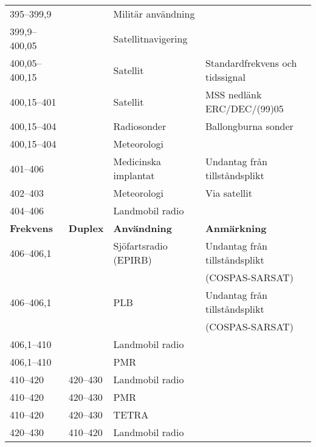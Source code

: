\begin{landscape}
\begin{longtable}{llll}
	395--399,9         &                    & Militär användning      &  \\
	399,9--400,05      &                    & Satellitnavigering      &  \\
	400,05--400,15     &                    & Satellit                & Standardfrekvens och tidssignal          \\
	400,15--401        &                    & Satellit                & MSS nedlänk ERC/DEC/(99)05               \\
	400,15--404        &                    & Radiosonder             & Ballongburna sonder                      \\
	400,15--404        &                    & Meteorologi             &  \\
	401--406           &                    & Medicinska implantat    & Undantag från tillståndsplikt            \\
	402--403           &                    & Meteorologi             & Via satellit                             \\
	404--406           &                    & Landmobil radio         &  \\
	\textbf{Frekvens}  & \textbf{Duplex}    & \textbf{Användning}     & \textbf{Anmärkning}                      \\ \hline
	406--406,1         &                    & Sjöfartsradio (EPIRB)   & Undantag från tillståndsplikt            \\
	                   &                    &                         & (COSPAS-SARSAT)                          \\
	406--406,1         &                    & PLB                     & Undantag från tillståndsplikt            \\
	                   &                    &                         & (COSPAS-SARSAT)                          \\
	406,1--410         &                    & Landmobil radio         &  \\
	406,1--410         &                    & PMR                     &  \\
	410--420           & 420--430           & Landmobil radio         &  \\
	410--420           & 420--430           & PMR                     &  \\
	410--420           & 420--430           & TETRA                   &  \\
	420--430           & 410--420           & Landmobil radio         &  \\

\end{longtable}
\end{landscape}
